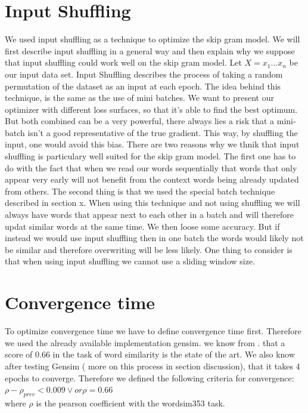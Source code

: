 \section{Input Shuffling}
We used input shuffling as a technique to optimize the skip gram model. We will first describe input shuffling in a general way and then explain why we suppose that input shuffling could work well on the skip gram model. 
Let $X = {x_1...x_n}$ be our input data set. Input Shuffling describes the process of taking a random permutation of the dataset as an input at each epoch. 
The idea behind this technique, is the same as the use of mini batches. We want to present our optimizer with different loss surfaces, so that it's able to find the best optimum. But both combined can be a very powerful, there always lies a risk that a mini-batch isn't a good representative of the true gradient. This way, by shuffling the input, one would avoid this bias.
There are two reasons why we thnik that input shuffling is particulary well suited for the skip gram model. The first one has to do with the fact that when we read our words sequentially that words that only appear very early will not benefit from the context words being already updated from others. The second thing is that we used the special batch technique described in section x.  When using this technique and not using shuffling we will always have words that appear next to each other in a batch and will therefore updat similar words at the same time. We then loose some accuracy. But if instead we would use input shuffling then in one batch the words would likely not be similar and therefore overwriting will be less likely. 
One thing to consider is that when using input shuffling we cannot use a sliding window size. 

\section{Convergence time} 
To optimize convergence time we have to define convergence time first. Therefore we used the already available implementation gensim. we know from \cite{intel}. that a score of $0.66$ in the task of word similarity is the state of the art. We also know after testing Gensim ( more on this process in section discussion), that it takes 4 epochs to converge. Therefore we defined the following criteria for convergence: \\
$\rho - \rho_{prev} < 0.009 \vee or \rho = 0.66$ \\
where $\rho$ is the pearson coefficient with the wordsim353 task. 


